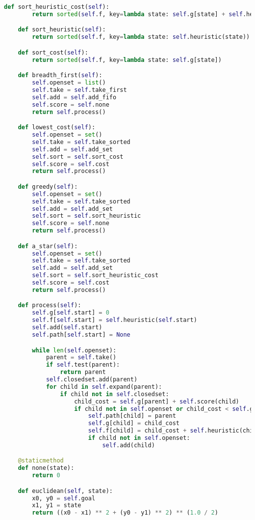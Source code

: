\documentclass[11pt,letterpaper]{article}
\begin{document}
\begin{lstlisting}[language=Python]
    def sort_heuristic_cost(self):
        return sorted(self.f, key=lambda state: self.g[state] + self.heuristic(state))

    def sort_heuristic(self):
        return sorted(self.f, key=lambda state: self.heuristic(state))

    def sort_cost(self):
        return sorted(self.f, key=lambda state: self.g[state])

    def breadth_first(self):
        self.openset = list()
        self.take = self.take_first
        self.add = self.add_fifo
        self.score = self.none
        return self.process()

    def lowest_cost(self):
        self.openset = set()
        self.take = self.take_sorted
        self.add = self.add_set
        self.sort = self.sort_cost
        self.score = self.cost
        return self.process()

    def greedy(self):
        self.openset = set()
        self.take = self.take_sorted
        self.add = self.add_set
        self.sort = self.sort_heuristic
        self.score = self.none
        return self.process()

    def a_star(self):
        self.openset = set()
        self.take = self.take_sorted
        self.add = self.add_set
        self.sort = self.sort_heuristic_cost
        self.score = self.cost
        return self.process()

    def process(self):
        self.g[self.start] = 0
        self.f[self.start] = self.heuristic(self.start)
        self.add(self.start)
        self.path[self.start] = None

        while len(self.openset):
            parent = self.take()
            if self.test(parent):
                return parent
            self.closedset.add(parent)
            for child in self.expand(parent):
                if child not in self.closedset:
                    child_cost = self.g[parent] + self.score(child)
                    if child not in self.openset or child_cost < self.g[child]:
                        self.path[child] = parent
                        self.g[child] = child_cost
                        self.f[child] = child_cost + self.heuristic(child)
                        if child not in self.openset:
                            self.add(child)

    @staticmethod
    def none(state):
        return 0

    def euclidean(self, state):
        x0, y0 = self.goal
        x1, y1 = state
        return ((x0 - x1) ** 2 + (y0 - y1) ** 2) ** (1.0 / 2)


\end{lstlisting}
\end{document}
